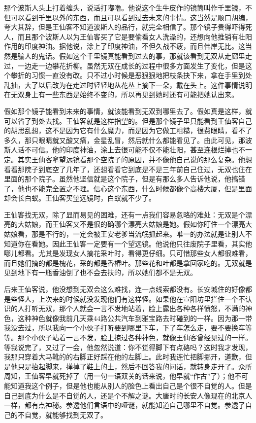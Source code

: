 那个波斯人头上打着缠头，说话打嘟噜。他说这个生牛皮作的镜筒叫作千里镜，不但可以看到千里以外的东西，而且可以看到过去未来的事情。这当然是顺口胡编，夸大其辞，但是王仙客不知道波斯人的品行，就完全相信了。那个镜子贵得吓得死人，而且那个波斯人以为王仙客买了它是要偷看女人洗澡的，还想向他推销有壮阳作用的印度神油。据他说，涂上了印度神油，不但久战不疲，而且伟岸无比。这当然是骗人的鬼话。假如这个千里镜真能看到过去的事，那就该看到无双从走廊里走过，一边走一边攀花折柳。虽然无双在成长的过程中很多方面发生了变化，但是这个攀折的习惯一直没有改。只不过小时候是恶狠狠地把枝条抉下来，拿在手里到处乱抽，大了以后改为在走过时轻轻地从花丛上摘下一朵，戴在头上。这件事情说明在无双身上有一些东西是始终不变的，所以再见到她时还有可能把她认出来。 

假如那个镜子能看到未来的事情，就该能看到无双到哪里去了。假如真是这样，就可以省了到处去找。王仙客就是这样指望的。但是那个镜子里只能看到王仙客自己的胡思乱想，这不是因为它有什么魔力，而是因为它做工粗糙，很费眼睛，看不了多久，那只眼睛就又酸又痛，金星乱冒，然后就什么都能看见了。由此可见，那波斯人话不可信。他的印度神油，涂上去很可能不仅不能壮阳，甚至连根烂掉也不一定。其实王仙客拿望远镜看那个空院子的原因，并不像他自己说的那么复杂。他想看看那院子到底空了几年了，还想看看它到底是不是三年前自己住过，无双也住在里面的那个院子。虽然他坚信就是这个院子，但是有那么多人告诉他说，他搞错了，他也不能完全置之不理。信心这个东西，什么时候都像个高楼大厦，但是里面却会长白蚁。王仙客买望远镜时，白蚁就不少了。 

王仙客找无双，除了显而易见的困难，还有一点我们容易忽略的难处：无双是个漂亮的大姑娘，而王仙客又不是很的确哪个漂亮大姑娘是她。假如你盯住一个漂亮大姑娘看，那是不行的，一定会被王安老爹当流氓抓起来。唯一的办法就是让别人不知道你在看她。因此王仙客一定要有一个望远镜。他说他只往废院子里看，其实他哪儿都看。尤其是发现女人摘花采叶时，看得更仔细。只可惜那些女人都很难看，而且她们摘的都是槐花，采的都是香椿叶。那些花和叶都是拿回家吃的。无双就是见到地下有一瓶香油倒了也不会去扶的，所以她们都不是无双。 

后来王仙客说，他没想到无双会这么难找，连一点线索都没有。长安城住的好像都是些怪人，上次来的时候就没发现他们有这样怪。如果他在宣阳坊里拦住一个不认识的人打听无双，那个人就会一言不发地站着，脸上露出各种各样愤怒，不满的神色，这种神色就像我前几天乘44路公共汽车到雅宝路去时碰到的一样。因为那一带我没去过，所以我向一个小伙子打听要到哪里下车，下了车怎么走，要不要换车等等。那个小伙子站着一言不发，脸上掠过各种神色，就像王仙客曾经见过的一样。等我说完了，又过了一会，他忽然说道：你不觉得脚下有点硌吗？这时我才发现，我那只穿着大马靴的的右脚正好踩在他的左脚上。此时我连忙把脚挪开，道歉，但是他只是抬起脚来，掸掉了鞋上的土，然后不回答我的问话，就转身走开了。众所周知，王仙客早就死掉了（用一句一语双关的话来说，他早就“作古”了）；他不可能知道我这个例子，但是他也能从别人的脸色上看出自己是个很不自觉的人。但是自己到底为什么是不自觉的人，还是个不解之谜。大唐时的长安人像现在的北京人一样，都有点神秘。参透他们言语中的哑谜，就能知道自己哪里不自觉。参透了自己的不自觉，就能够找到无双了。 

